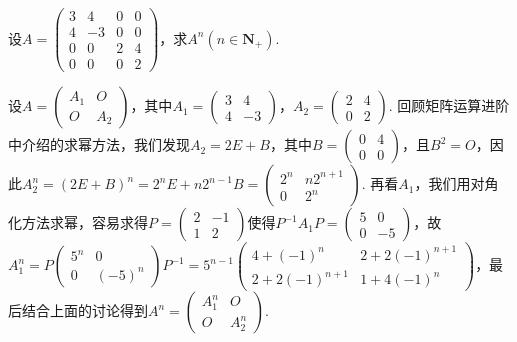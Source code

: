 \begin{exercise}
\begin{exgroup}
        \item 设$A=\begin{pmatrix}
                3 & 4 & 0 & 0 \\ 4 & -3 & 0 & 0 \\ 0 & 0 & 2 & 4 \\ 0 & 0 & 0 & 2
            \end{pmatrix}$，求$A^n(n\in\mathbf{N}_+)$.
        \begin{answer}
            设$A=\begin{pmatrix}
                A_1 & O \\ O & A_2
            \end{pmatrix}$，其中$A_1=\begin{pmatrix}
                3 & 4 \\ 4 & -3
            \end{pmatrix}$，$A_2=\begin{pmatrix}
                2 & 4 \\ 0 & 2
            \end{pmatrix}$. 回顾矩阵运算进阶中介绍的求幂方法，我们发现$A_2=2E+B$，其中$B=\begin{pmatrix}
                0 & 4 \\ 0 & 0
            \end{pmatrix}$，且$B^2=O$，因此$A_2^n=(2E+B)^n=2^nE+n2^{n-1}B=\begin{pmatrix}
                2^n & n2^{n+1} \\ 0 & 2^n
            \end{pmatrix}$. 再看$A_1$，我们用对角化方法求幂，容易求得$P=\begin{pmatrix}
                2 & -1 \\ 1 & 2
            \end{pmatrix}$使得$P^{-1}A_1P=\begin{pmatrix}
                5 & 0 \\ 0 & -5
            \end{pmatrix}$，故$A_1^n=P\begin{pmatrix}
                5^n & 0 \\ 0 & (-5)^n
            \end{pmatrix}P^{-1}=5^{n-1}\begin{pmatrix}
                4+(-1)^n & 2+2(-1)^{n+1} \\ 2+2(-1)^{n+1} & 1+4(-1)^n
            \end{pmatrix}$，最后结合上面的讨论得到$A^n=\begin{pmatrix}
                A_1^n & O \\ O & A_2^n
            \end{pmatrix}$.
        \end{answer}


\end{exgroup}
\end{exercise}
